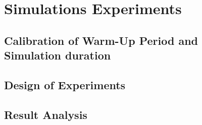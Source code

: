\section{Simulations Experiments}
\subsection{Calibration of Warm-Up Period and Simulation duration}
\subsection{Design of Experiments}
\subsection{Result Analysis}